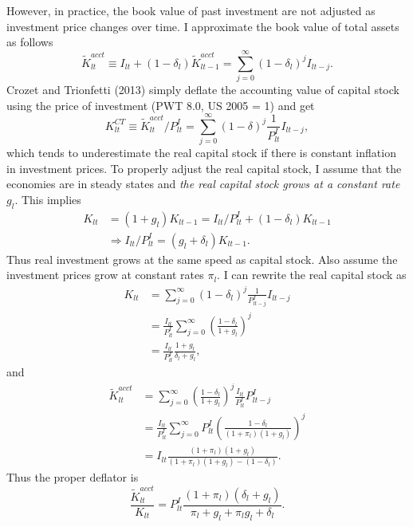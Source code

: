 \documentclass[notitlepage,11pt]{article}%
\begin{document}
However, in practice, the book value of past investment are not adjusted as
investment price changes over time. I approximate the book value of total
assets as follows%
\[
\tilde{K}_{lt}^{acct}\equiv I_{lt}+\left(  1-\delta_{l}\right)  \tilde
{K}_{lt-1}^{acct}=\sum_{j=0}^{\infty}\left(  1-\delta_{l}\right)  ^{j}%
I_{lt-j}.
\]
Crozet and Trionfetti (2013) simply deflate the accounting value of capital
stock using the price of investment (PWT 8.0, US 2005 = 1) and get%
\[
K_{lt}^{CT}\equiv\tilde{K}_{lt}^{acct}/P_{lt}^{I}=\sum_{j=0}^{\infty}\left(
1-\delta\right)  ^{j}\frac{1}{P_{lt}^{I}}I_{lt-j},
\]
which tends to underestimate the real capital stock if there is constant
inflation in investment prices. To properly adjust the real capital stock, I
assume that the economies are in steady states and \emph{the real capital
stock grows at a constant rate }$g_{l}$. This implies%
\begin{align*}
K_{lt}  &  =\left(  1+g_{l}\right)  K_{lt-1}=I_{lt}/P_{lt}^{I}+\left(
1-\delta_{l}\right)  K_{lt-1}\\
&  \Rightarrow I_{lt}/P_{lt}^{I}=\left(  g_{l}+\delta_{l}\right)  K_{lt-1}.
\end{align*}
Thus real investment grows at the same speed as capital stock. Also assume the
investment prices grow at constant rates $\pi_{l}$. I can rewrite the real
capital stock as
\begin{align*}
K_{lt}  &  =\sum_{j=0}^{\infty}\left(  1-\delta_{l}\right)  ^{j}\frac
{1}{P_{lt-j}^{I}}I_{lt-j}\\
&  =\frac{I_{lt}}{P_{lt}^{I}}\sum_{j=0}^{\infty}\left(  \frac{1-\delta_{l}%
}{1+g_{l}}\right)  ^{j}\\
&  =\frac{I_{lt}}{P_{lt}^{I}}\frac{1+g_{l}}{\delta_{l}+g_{l}},
\end{align*}
and
\begin{align*}
\tilde{K}_{lt}^{acct}  &  =\sum_{j=0}^{\infty}\left(  \frac{1-\delta_{l}%
}{1+g_{l}}\right)  ^{j}\frac{I_{lt}}{P_{lt}^{I}}P_{lt-j}^{I}\\
&  =\frac{I_{lt}}{P_{lt}^{I}}\sum_{j=0}^{\infty}P_{lt}^{I}\left(
\frac{1-\delta_{l}}{\left(  1+\pi_{l}\right)  \left(  1+g_{l}\right)
}\right)  ^{j}\\
&  =I_{lt}\frac{\left(  1+\pi_{l}\right)  \left(  1+g_{l}\right)  }{\left(
1+\pi_{l}\right)  \left(  1+g_{l}\right)  -\left(  1-\delta_{l}\right)  }.
\end{align*}
Thus the proper deflator is%
\[
\frac{\tilde{K}_{lt}^{acct}}{K_{lt}}=P_{lt}^{I}\frac{\left(  1+\pi_{l}\right)
\left(  \delta_{l}+g_{l}\right)  }{\pi_{l}+g_{l}+\pi_{l}g_{l}+\delta_{l}}.
\]
\end{document}
